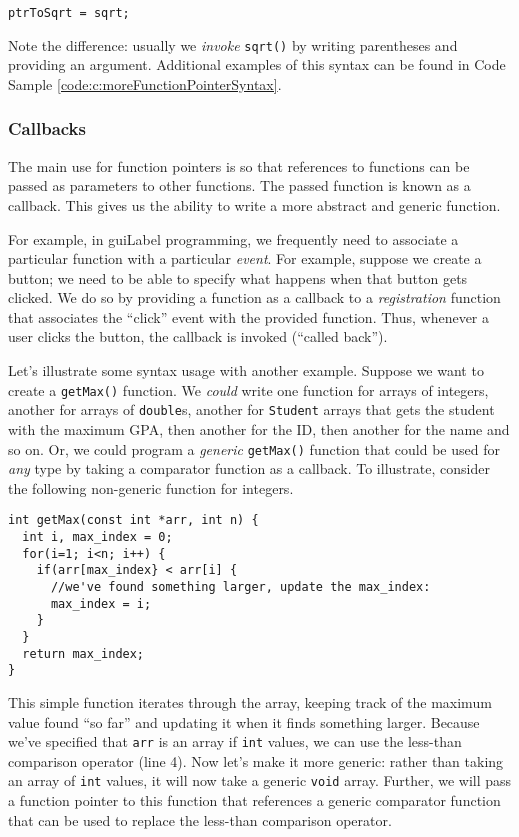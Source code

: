\texttt{ptrToSqrt = sqrt;}

Note the difference: usually we \emph{invoke} \texttt{sqrt()} by 
writing parentheses and providing an argument.  Additional examples 
of this syntax can be found in Code Sample \ref{code:c:moreFunctionPointerSyntax}.

\subsubsection{Callbacks}

The main use for function pointers is so that references to functions can be passed 
as parameters to other functions.  The passed function is known as a 
\gls{callback}.  This gives us the ability to write a more abstract and
generic function.  

For example, in \gls{guiLabel} programming, we frequently need to associate
a particular function with a particular \emph{event}.  For example, suppose
we create a button; we need to be able to specify what happens when that
button gets clicked.  We do so by providing a function as a callback to
a \emph{registration} function that associates the ``click'' event with the
provided function.  Thus, whenever a user clicks the button, the callback
is invoked (``called back'').  

Let's illustrate some syntax usage with another example.  Suppose we want to 
create a \texttt{getMax()} function.  We \emph{could} write one 
function for arrays of integers, another for arrays of \texttt{double}s, 
another for \texttt{Student} arrays that gets the student with the
maximum GPA, then another for the ID, then another for the name and so on.  
Or, we could program a \emph{generic} \texttt{getMax()} function
that could be used for \emph{any} type by taking a comparator function as
a callback.  To illustrate, consider the following non-generic function for
integers.

\begin{verbatim}
int getMax(const int *arr, int n) {
  int i, max_index = 0;
  for(i=1; i<n; i++) {
    if(arr[max_index} < arr[i] {
      //we've found something larger, update the max_index:
      max_index = i;
    }
  }
  return max_index;
}
\end{verbatim}

This simple function iterates through the array, keeping track of the maximum
value found ``so far'' and updating it when it finds something larger.  Because
we've specified that \texttt{arr} is an array if \texttt{int}
values, we can use the less-than comparison operator (line 4).  Now let's make
it more generic: rather than taking an array of \texttt{int} values, 
it will now take a generic \texttt{void} array.  Further, we will
pass a function pointer to this function that references a generic comparator
function that can be used to replace the less-than comparison operator.

